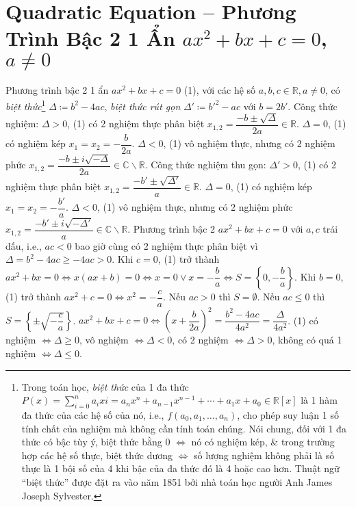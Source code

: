 \documentclass{article}
\begin{document}
\section{Quadratic Equation -- Phương Trình Bậc 2 1 Ẩn $ax^2 + bx + c = 0$, $a\ne0$}
 Phương trình bậc 2 1 ẩn $ax^2 + bx + c = 0$ (1), với các hệ số $a,b,c\in\mathbb{R},a\ne0$, có \textit{biệt thức}\footnote{Trong toán học, \textit{biệt thức} của 1 đa thức $P(x) = \sum_{i=0}^n a_ixi = a_nx^n + a_{n-1}x^{n-1} + \cdots + a_1x + a_0\in\mathbb{R}[x]$ là 1 hàm đa thức của các hệ số của nó, i.e., $f(a_0,a_1,\ldots,a_n)$, cho phép suy luận 1 số tính chất của nghiệm mà không cần tính toán chúng. Nói chung, đối với 1 đa thức có bậc tùy ý, biệt thức bằng 0 $\Leftrightarrow$ nó có nghiệm kép, \& trong trường hợp các hệ số thực, biệt thức dương $\Leftrightarrow$ số lượng nghiệm không phải là số thực là 1 bội số của 4 khi bậc của đa thức đó là 4 hoặc cao hơn. Thuật ngữ ``biệt thức'' được đặt ra vào năm 1851 bởi nhà toán học người Anh James Joseph Sylvester.} $\Delta\coloneqq b^2 - 4ac$, \textit{biệt thức rút gọn} $\Delta'\coloneqq b'^2 - ac$ với $b = 2b'$.  Công thức nghiệm: $\Delta > 0$, (1) có 2 nghiệm thực phân biệt $x_{1,2} = \dfrac{-b\pm\sqrt{\Delta}}{2a}\in\mathbb{R}$. $\Delta = 0$, (1) có nghiệm kép $x_1 = x_2 = -\dfrac{b}{2a}$. $\Delta < 0$, (1) vô nghiệm thực, nhưng có 2 nghiệm phức $x_{1,2} = \dfrac{-b\pm i\sqrt{-\Delta}}{2a}\in\mathbb{C}\backslash\mathbb{R}$.  Công thức nghiệm thu gọn: $\Delta' > 0$, (1) có 2 nghiệm thực phân biệt $x_{1,2} = \dfrac{-b'\pm\sqrt{\Delta'}}{a}\in\mathbb{R}$. $\Delta = 0$, (1) có nghiệm kép $x_1 = x_2 = -\dfrac{b'}{a}$. $\Delta < 0$, (1) vô nghiệm thực, nhưng có 2 nghiệm phức $x_{1,2} = \dfrac{-b'\pm i\sqrt{-\Delta'}}{a}\in\mathbb{C}\backslash\mathbb{R}$.  Phương trình bậc 2 $ax^2 + bx + c = 0$ với $a,c$ trái dấu, i.e., $ac < 0$ bao giờ cùng có 2 nghiệm thực phân biệt vì $\Delta = b^2 - 4ac\ge-4ac > 0$.  Khi $c = 0$, (1) trở thành $ax^2 + bx = 0\Leftrightarrow x(ax + b) = 0\Leftrightarrow x = 0\lor x = -\dfrac{b}{a}\Leftrightarrow S = \left\{0,-\dfrac{b}{a}\right\}$.  Khi $b = 0$, (1) trở thành $ax^2 + c = 0\Leftrightarrow x^2 = -\dfrac{c}{a}$. Nếu $ac > 0$ thì $S = \emptyset$. Nếu $ac\le0$ thì $S = \left\{\pm\sqrt{-\dfrac{c}{a}}\right\}$.  $ax^2 + bx + c = 0\Leftrightarrow\left(x + \dfrac{b}{2a}\right)^2 = \dfrac{b^2 - 4ac}{4a^2} = \dfrac{\Delta}{4a^2}$.  (1) có nghiệm $\Leftrightarrow\Delta\ge0$, vô nghiệm $\Leftrightarrow\Delta < 0$, có 2 nghiệm $\Leftrightarrow\Delta > 0$, không có quá 1 nghiệm $\Leftrightarrow\Delta\le0$.\\
\end{document}
